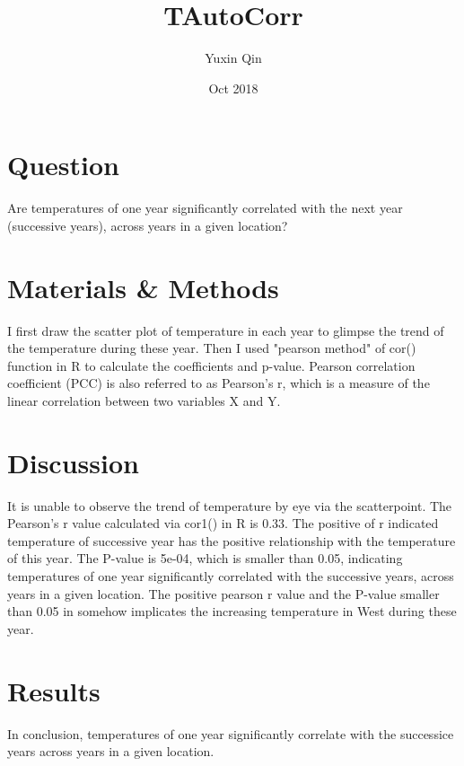 \documentclass[12pt]{article}
\title{TAutoCorr}
\author{Yuxin Qin}
\date{Oct 2018}
\begin{document}
  \maketitle

  \section{Question}
    Are temperatures of one year significantly correlated with the next year (successive years), across years in a given location?

  \section{Materials \& Methods}
    I first draw the scatter plot of temperature in each year to glimpse the trend of the temperature during these year.
    Then I used "pearson method" of cor() function in R to calculate the coefficients and p-value. Pearson correlation coefficient (PCC) is also referred to as Pearson's r, which is a measure of the linear correlation between two variables X and Y. 

  \section{Discussion}
    It is unable to observe the trend of temperature by eye via the scatterpoint. 
    The Pearson's r value calculated via cor1() in R is 0.33. The positive of r indicated temperature of successive year has the positive relationship with the temperature of this year. 
    The P-value is 5e-04, which is smaller than 0.05, indicating temperatures of one year significantly correlated with the successive years, across years in a given location.
    The positive pearson r value and the P-value smaller than 0.05 in somehow implicates the increasing temperature in West during these year.

  \section{Results}
    In conclusion, temperatures of one year significantly correlate with the successice years across years in a given location. 
  
\end{document}
